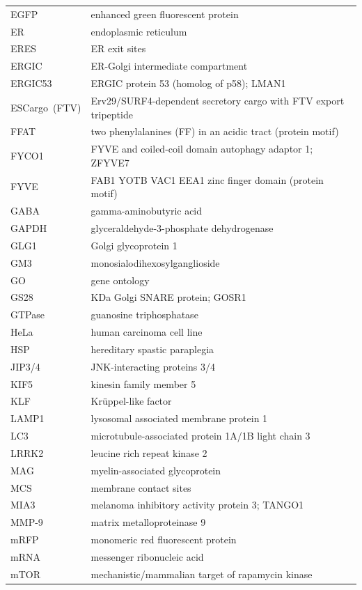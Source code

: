 \documentclass[
  12pt,
  a4paper,
]{book}
\begin{document}
\begin{longtable}[]{@{}
  >{\raggedright\arraybackslash}p{}
  >{\raggedright\arraybackslash}p{}@{}}
EGFP & enhanced green fluorescent protein \\
ER & endoplasmic reticulum \\
ERES & ER exit sites \\
ERGIC & ER-Golgi intermediate compartment \\
ERGIC53 & ERGIC protein 53 (homolog of p58); LMAN1 \\
ESCargo~(FTV) & Erv29/SURF4-dependent secretory cargo with FTV export tripeptide \\
FFAT & two phenylalanines (FF) in an acidic tract (protein motif) \\
FYCO1 & FYVE and coiled-coil domain autophagy adaptor 1; ZFYVE7 \\
FYVE & FAB1 YOTB VAC1 EEA1 zinc finger domain (protein motif) \\
GABA & gamma-aminobutyric acid \\
GAPDH & glyceraldehyde-3-phosphate dehydrogenase \\
GLG1 & Golgi glycoprotein 1 \\
GM3 & monosialodihexosylganglioside \\
GO & gene ontology \\
GS28 & 28 KDa Golgi SNARE protein; GOSR1 \\
GTPase & guanosine triphosphatase \\
HeLa & human carcinoma cell line \\
HSP & hereditary spastic paraplegia \\
JIP3/4 & JNK-interacting proteins 3/4 \\
KIF5 & kinesin family member 5 \\
KLF & Krüppel-like factor \\
LAMP1 & lysosomal associated membrane protein 1 \\
LC3 & microtubule-associated protein 1A/1B light chain 3 \\
LRRK2 & leucine rich repeat kinase 2 \\
MAG & myelin-associated glycoprotein \\
MCS & membrane contact sites \\
MIA3 & melanoma inhibitory activity protein 3; TANGO1 \\
MMP-9 & matrix metalloproteinase 9 \\
mRFP & monomeric red fluorescent protein \\
mRNA & messenger ribonucleic acid \\
mTOR & mechanistic/mammalian target of rapamycin kinase \\

\end{longtable}
\end{document}
